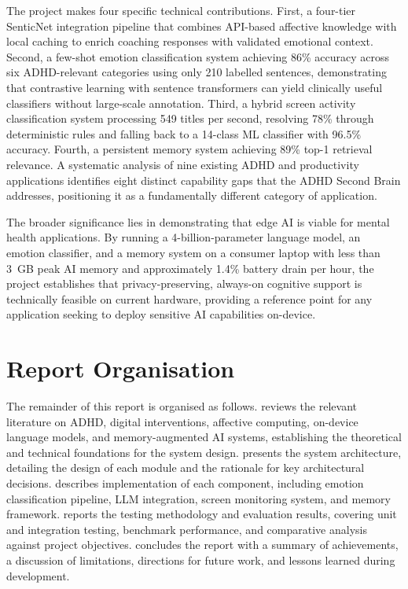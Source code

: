 The project makes four specific technical contributions. First, a four-tier SenticNet integration pipeline that combines API-based affective knowledge with local caching to enrich coaching responses with validated emotional context. Second, a few-shot emotion classification system achieving 86\% accuracy across six ADHD-relevant categories using only 210 labelled sentences, demonstrating that contrastive learning with sentence transformers \cite{reimers2019} can yield clinically useful classifiers without large-scale annotation. Third, a hybrid screen activity classification system processing 549 titles per second, resolving 78\% through deterministic rules and falling back to a 14-class ML classifier with 96.5\% accuracy. Fourth, a persistent memory system achieving 89\% top-1 retrieval relevance. A systematic analysis of nine existing ADHD and productivity applications identifies eight distinct capability gaps that the ADHD Second Brain addresses, positioning it as a fundamentally different category of application.

The broader significance lies in demonstrating that edge AI is viable for mental health applications. By running a 4-billion-parameter language model, an emotion classifier, and a memory system on a consumer laptop with less than 3~GB peak AI memory and approximately 1.4\% battery drain per hour, the project establishes that privacy-preserving, always-on cognitive support is technically feasible on current hardware, providing a reference point for any application seeking to deploy sensitive AI capabilities on-device.

\section{Report Organisation}
\label{sec:report-organisation}

The remainder of this report is organised as follows.  reviews the relevant literature on ADHD, digital interventions, affective computing, on-device language models, and memory-augmented AI systems, establishing the theoretical and technical foundations for the system design.  presents the system architecture, detailing the design of each module and the rationale for key architectural decisions.  describes implementation of each component, including emotion classification pipeline, LLM integration, screen monitoring system, and memory framework.  reports the testing methodology and evaluation results, covering unit and integration testing, benchmark performance, and comparative analysis against project objectives.  concludes the report with a summary of achievements, a discussion of limitations, directions for future work, and lessons learned during development.
